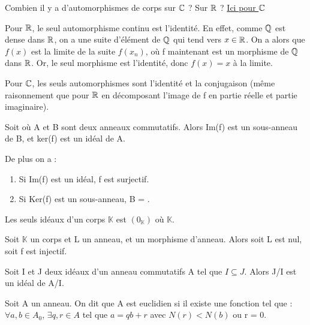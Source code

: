\documentclass[a4paper, 12pt]{article}
\begin{document}
\begin{question}
	Combien il y a d'automorphismes de corps sur $\mathbb{C}$ ? Sur $\mathbb{R}$ ?
	\href{http://www.math.uga.edu/~pete/Kestelman51.pdf}{Ici pour $\mathbb{C}$}

	Pour $\mathbb{R}$, le seul automorphisme continu est l'identité. En effet, comme
	$\mathbb{Q}$ est dense dans $\mathbb{R}$, on a une suite d'élément de $\mathbb{Q}$
	qui tend vers $x \in \mathbb{R}$. On a alors que $f(x)$ est la limite de la suite
	$f(x_{n})$, où f maintenant est un morphisme de $\mathbb{Q}$ dans $\mathbb{R}$.
	Or, le seul morphisme est l'identité, donc $f(x) = x$ à la limite.

	Pour $\mathbb{C}$, les seuls automorphismes sont l'identité et la conjugaison
	(même raisonnement que pour $\mathbb{R}$ en décomposant l'image de f en partie
	réelle et partie imaginaire).
\end{question}

\begin{proposition}
	Soit  où A et B sont deux anneaux commutatifs. Alors
	Im(f) est un sous-anneau de B, et ker(f) est un idéal de A.

	De plus on a :
	\begin{enumerate}
		\item Si Im(f) est un idéal, f est surjectif.
		\item Si Ker(f) est un sous-anneau, B = .
	\end{enumerate}
\end{proposition}

\begin{proposition}
	Les seuls idéaux d'un corps $\mathbb{K}$ est $(0_{\mathbb{K}})$ où
	$\mathbb{K}$.
\end{proposition}

\begin{corollary}
	Soit $\mathbb{K}$ un corps et L un anneau, et
	 un morphisme d'anneau. Alors soit L est nul,
	soit f est injectif.
\end{corollary}

\begin{proposition}
	Soit I et J deux idéaux d'un anneau commutatifs A tel que $I \subseteq J$.
	Alors J/I est un idéal de A/I.
\end{proposition}

\begin{definition}
	Soit A un anneau. On dit que A est euclidien si il existe une fonction
	 tel que : $\forall a, b \in A_{0}$, $\exists q,
	r \in A$ tel que $a = qb + r$ avec $N(r) < N(b)$ ou r = 0.
\end{definition}
\end{document}
